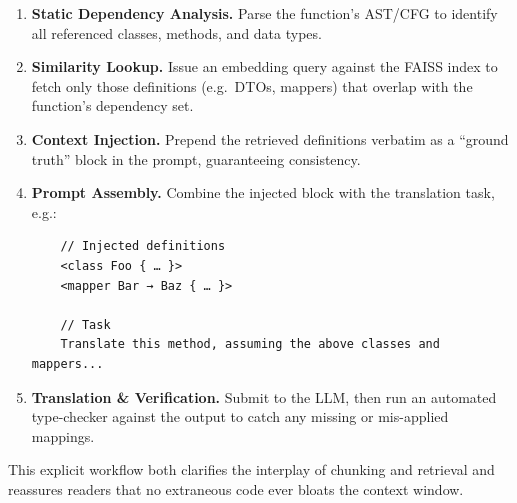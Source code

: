 \documentclass[twocolumn]{article}
\begin{document}
\begin{enumerate}
  \item \textbf{Static Dependency Analysis.}  
    Parse the function’s AST/CFG to identify all referenced classes, methods, and data types.
  \item \textbf{Similarity Lookup.}  
    Issue an embedding query against the FAISS index to fetch only those definitions (e.g.\ DTOs, mappers) that overlap with the function’s dependency set.
  \item \textbf{Context Injection.}  
    Prepend the retrieved definitions verbatim as a “ground truth” block in the prompt, guaranteeing consistency.
  \item \textbf{Prompt Assembly.}  
    Combine the injected block with the translation task, e.g.:
    \begin{verbatim}
    // Injected definitions
    <class Foo { … }>
    <mapper Bar → Baz { … }>

    // Task
    Translate this method, assuming the above classes and mappers...
    \end{verbatim}
  \item \textbf{Translation \& Verification.}  
    Submit to the LLM, then run an automated type-checker against the output to catch any missing or mis-applied mappings.
\end{enumerate}

This explicit workflow both clarifies the interplay of chunking and retrieval and reassures readers that no extraneous code ever bloats the context window.
\end{document}

